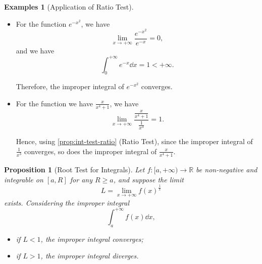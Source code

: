 \documentclass[11pt]{article}
\numberwithin{equation}{section}
\newtheorem{proposition}[theorem]{Proposition}
\theoremstyle{definition}
\newtheorem{examples}[theorem]{Examples}
\theoremstyle{remark}
\newcommand{\pqty}[1]{\left(#1\right)}
\newcommand{\ccintv}[2]{[#1,#2]}
\newcommand{\cointv}[2]{[#1,#2)}
\newcommand{\functiondomain}[3]{#1:#2\to #3}
\newcommand{\RR}{\mathbb R}
\newcommand{\plusinfty}{+\infty}
\begin{document}
\begin{examples}[Application of Ratio Test]\label{analysis-unit-0188}
    \label{ex:application-ratio-test}%
    \begin{itemize}
        \item For the function \(e^{-x^2}\), we have
        \[
            \lim_{x \to \plusinfty} \frac{e^{-x^2}}{e^{-x}} = 0,
        \]
        and we have
        \[
            \int_{0}^{\plusinfty} e^{-x} \dd{x} = 1 < \plusinfty.
        \]

        Therefore, the improper integral of \(e^{-x^2}\) converges.

        \item For the function we have \(\frac{x}{x^4 + 1}\), we have
        \[
            \lim_{x \to \plusinfty} \frac{\frac{x}{x^4 + 1}}{\frac{1}{x^3}} = 1.
        \]

        Hence, using \autoref{prop:int-test-ratio} (Ratio Test), since the improper integral of \(\frac{1}{x^3}\) converges, so does the improper integral of \(\frac{x}{x^4 + 1}\).
    \end{itemize}
\end{examples}

\begin{proposition}[Root Test for Integrals]\label{analysis-unit-0189}
    \label{prop:int-test-root}%
    Let \(\functiondomain{f}{\cointv{a}{\plusinfty}}{\RR}\) be non-negative and integrable on \(\ccintv{a}{R}\) for any \(R \geq a\), and suppose the limit
    \[
        L = \lim_{x \to \plusinfty} f\pqty{x}^{\frac{1}{x}}
    \]
    exists. Considering the improper integral
    \[
        \int_{a}^{\plusinfty} f\pqty{x} \dd{x},
    \]
    \begin{itemize}
        \item if \(L < 1\), the improper integral converges; 
        \item if \(L > 1\), the improper integral diverges.
    \end{itemize}
\end{proposition}
\end{document}
